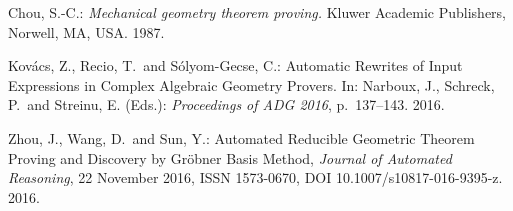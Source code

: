 \begin{thebibliography}{9}

Chou, S.-C.: \textit{Mechanical geometry theorem proving.} Kluwer Academic Publishers,
Norwell, MA, USA. 1987.

Kov\'acs, Z., Recio, T.~and S\'olyom-Gecse, C.:
Automatic Rewrites of Input Expressions in Complex Algebraic Geometry Provers.
In: Narboux, J., Schreck, P.~and Streinu, E. (Eds.): \textit{Proceedings of ADG 2016}, p.~137--143. 2016.

Zhou, J., Wang, D.~and Sun, Y.: Automated Reducible Geometric Theorem Proving and Discovery by Gr{\"o}bner Basis Method,
\textit{Journal of Automated Reasoning}, 22 November 2016, ISSN 1573-0670, DOI 10.1007/s10817-016-9395-z. 2016.

\end{thebibliography}

